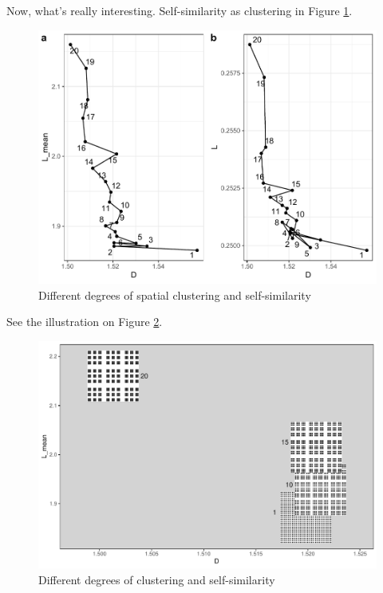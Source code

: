 \documentclass[
  12pt,
]{book}
\begin{document}
Now, what's really interesting. Self-similarity as clustering in Figure \ref{fig:08-clustering}.



\begin{figure}

{\centering \includegraphics[width=0.9\linewidth]{bookdown-demo_files/figure-latex/08-clustering-1} 

}

\caption{Different degrees of spatial clustering and self-similarity}\label{fig:08-clustering}
\end{figure}

See the illustration on Figure \ref{fig:08-clustering-im}.

\begin{figure}
\hypertarget{fig:08-clustering-im}{%
\centering
\includegraphics{Results/fig08_clustering_im.pdf}
\caption{Different degrees of clustering and self-similarity}\label{fig:08-clustering-im}
}
\end{figure}
\end{document}
